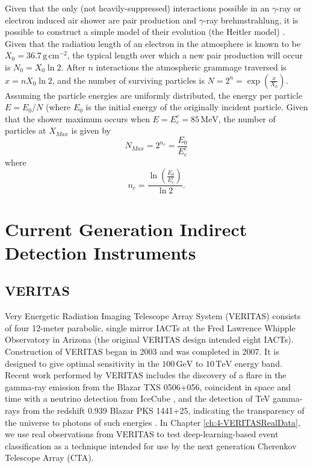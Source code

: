 Given that the only (not heavily-suppressed) interactions possible in an $\gamma$-ray or electron induced air shower are pair production and $\gamma$-ray brehmstrahlung, it is possible to construct a simple model of their evolution (the Heitler model) \cite{heitler}. Given that the radiation length of an electron in the atmosphere is known to be $X_0=\mathrm{36.7\,g\,cm^{-2}}$, the typical length over which a new pair production will occur is $N_0=X_0 \ln 2$. After $n$ interactions the atmospheric grammage traversed is $x=nX_0 \ln 2$, and the number of surviving particles is $N=2^n=\exp \left( \frac{x}{X_0}\right)$. Assuming the particle energies are uniformly distributed, the energy per particle $E=E_0/N$ (where $E_0$ is the initial energy of the originally incident particle. Given that the shower maximum occurs when $E=E_c^e=\mathrm{85\,MeV}$, the number of particles at $X_{Max}$ is given by \cite{heitler} 
\begin{equation}
    N_{Max}=2^{n_c}=\frac{E_0}{E_c^e}
\end{equation}
where 
\begin{equation}
n_c=\frac{\ln (\frac{E_0}{E_e^c})}{\ln 2}.
\end{equation}
\section{Current Generation Indirect Detection Instruments}
\subsection{VERITAS}
Very Energetic Radiation Imaging Telescope Array System (VERITAS) consists of four 12-meter parabolic, single mirror IACTs at the Fred Lawrence Whipple Observatory in Arizona (the original VERITAS design intended eight IACTs). Construction of VERITAS began in 2003 and was completed in 2007. It is designed to give optimal sensitivity in the $\mathrm{100\,GeV}$ to $\mathrm{10\,TeV}$ energy band. Recent work performed by VERITAS includes the discovery of a flare in the gamma-ray emission from the Blazar TXS 0506+056, coincident in space and time with a neutrino detection from IceCube \cite{TXS}, and the detection of TeV gamma-rays from the redshift 0.939 Blazar PKS 1441+25, indicating the transparency of the universe to photons of such energies \cite{escape}. In Chapter \ref{ch:4-VERITASRealData}, we use real observations from VERITAS to test deep-learning-based event classification as a technique intended for use by the next generation Cherenkov Telescope Array (CTA).

